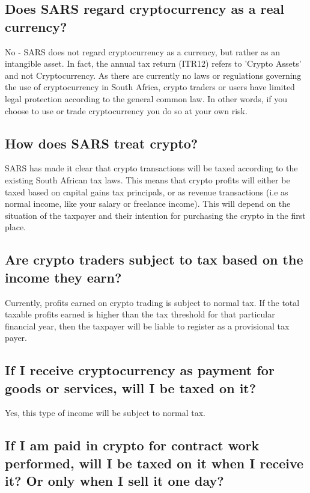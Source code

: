 \subsection{Does SARS regard cryptocurrency as a real currency?}

No - SARS does not regard cryptocurrency as a currency, but rather as an intangible asset.  In fact, the annual tax return (ITR12) refers to 'Crypto Assets' and not Cryptocurrency.  As there are currently no laws or regulations governing the use of cryptocurrency in South Africa, crypto traders or users have limited legal protection according to the general common law. In other words, if you choose to use or trade cryptocurrency you do so at your own risk.


\subsection{How does SARS treat crypto?}


SARS has made it clear that crypto transactions  will be taxed according to the existing South African tax laws. This means that crypto profits will either be taxed based on capital gains tax principals, or as revenue transactions (i.e as normal income, like your salary or freelance income). This will depend on the situation of the taxpayer and their intention for purchasing the crypto in the first place. 


\subsection{Are crypto traders subject to tax based on the income they earn?}


Currently, profits earned on crypto trading is subject to normal tax. If the total taxable profits earned is higher than the tax threshold for that particular financial year, then the taxpayer will be liable to register as a provisional tax payer.


\subsection{If I receive cryptocurrency as payment for goods or services, will I be taxed on it?}


Yes, this type of income will be subject to normal tax.

 

\subsection{If I am paid in crypto for contract work performed, will I be taxed on it when I receive it? Or only when I sell it one day?}


